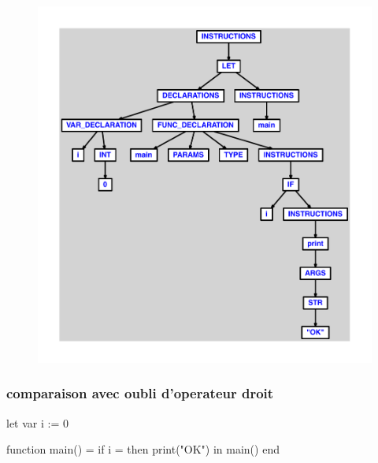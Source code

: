 \documentclass{article}
\begin{document}
\begin{figure}[H]\centering\includegraphics[max width=\textwidth]{ast/ast_165.pdf}\end{figure}\subsubsection{comparaison avec oubli d'operateur droit}
\begin{verbatimtab}
let
	var i := 0

	function main() =
		if i = then print("OK")
in main() end
\end{verbatimtab}
\end{document}
